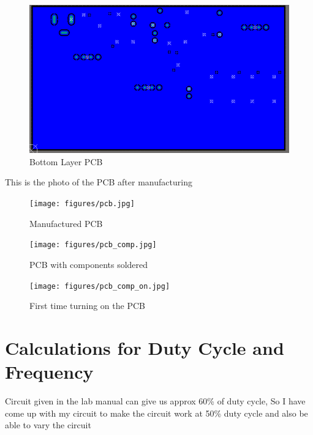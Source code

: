 \documentclass[a4paper,11pt]{article}%
\begin{document}
\begin{figure}[H]
	\centering
	\includegraphics[scale=0.7]{figures/bottom.png}
	\caption{Bottom Layer PCB}
	\label{bottom}
\end{figure}

This is the photo of the PCB after manufacturing\\

\begin{figure}[H]
	\centering
	\texttt{[image: figures/pcb.jpg]}
	\caption{Manufactured PCB}
\end{figure}

\begin{figure}[H]
	\centering
	\texttt{[image: figures/pcb\_comp.jpg]}
	\caption{PCB with components soldered}
\end{figure}


\begin{figure}[H]
	\centering
	\texttt{[image: figures/pcb\_comp\_on.jpg]}
	\caption{First time turning on the PCB}
\end{figure}



\section{Calculations for Duty Cycle and Frequency}


Circuit given in the lab manual can give us approx 60\% 
of duty cycle, So I have come up with my circuit to make the circuit work at 50\% duty cycle and also be able to vary the circuit\\
\end{document}
